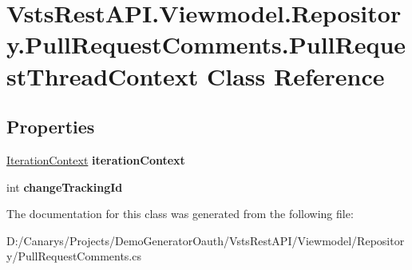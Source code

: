 \hypertarget{class_vsts_rest_a_p_i_1_1_viewmodel_1_1_repository_1_1_pull_request_comments_1_1_pull_request_thread_context}{}\section{Vsts\+Rest\+A\+P\+I.\+Viewmodel.\+Repository.\+Pull\+Request\+Comments.\+Pull\+Request\+Thread\+Context Class Reference}
\label{class_vsts_rest_a_p_i_1_1_viewmodel_1_1_repository_1_1_pull_request_comments_1_1_pull_request_thread_context}
\subsection*{Properties}
\begin{DoxyCompactItemize}
\item 
\mbox{\label{class_vsts_rest_a_p_i_1_1_viewmodel_1_1_repository_1_1_pull_request_comments_1_1_pull_request_thread_context_a2a5d1d2516816c8aacabc095d969b6fc}} 
\mbox{\hyperlink{class_vsts_rest_a_p_i_1_1_viewmodel_1_1_repository_1_1_pull_request_comments_1_1_iteration_context}{Iteration\+Context}} {\bfseries iteration\+Context}
\item 
\mbox{\label{class_vsts_rest_a_p_i_1_1_viewmodel_1_1_repository_1_1_pull_request_comments_1_1_pull_request_thread_context_a62cec21d9ae37e2cbf75c32069521f73}} 
int {\bfseries change\+Tracking\+Id}
\end{DoxyCompactItemize}


The documentation for this class was generated from the following file\+:\begin{DoxyCompactItemize}
\item 
D\+:/\+Canarys/\+Projects/\+Demo\+Generator\+Oauth/\+Vsts\+Rest\+A\+P\+I/\+Viewmodel/\+Repository/Pull\+Request\+Comments.\+cs\end{DoxyCompactItemize}
